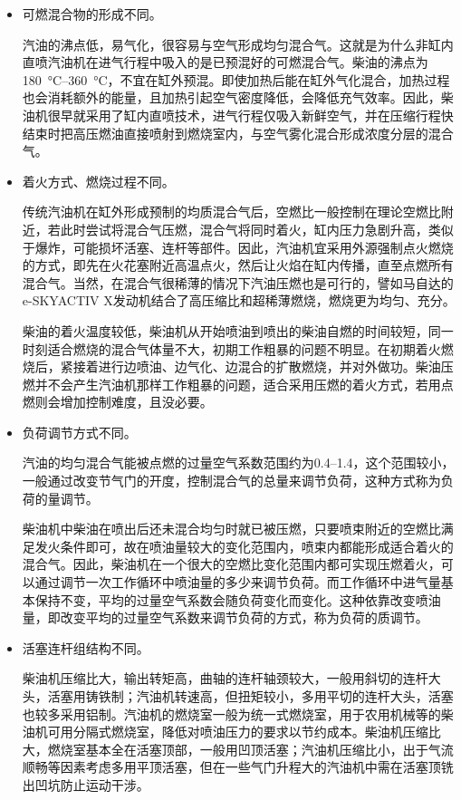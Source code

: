 \documentclass[UTF8]{ctexart}
\numberwithin{figure}{section}
\numberwithin{table}{section}
\begin{document}
\begin{itemize}
	\item 可燃混合物的形成不同。

	      汽油的沸点低，易气化，很容易与空气形成均匀混合气。这就是为什么非缸内直喷汽油机在进气行程中吸入的是已预混好的可燃混合气。柴油的沸点为\qtyrange[range-phrase = $\,\sim\,$, range-units = single]{180}{360}{\celsius}，不宜在缸外预混。即使加热后能在缸外气化混合，加热过程也会消耗额外的能量，且加热引起空气密度降低，会降低充气效率。因此，柴油机很早就采用了缸内直喷技术，进气行程仅吸入新鲜空气，并在压缩行程快结束时把高压燃油直接喷射到燃烧室内，与空气雾化混合形成浓度分层的混合气。

	\item 着火方式、燃烧过程不同。

	      传统汽油机在缸外形成预制的均质混合气后，空燃比一般控制在理论空燃比附近，若此时尝试将混合气压燃，混合气将同时着火，缸内压力急剧升高，类似于爆炸，可能损坏活塞、连杆等部件。因此，汽油机宜采用外源强制点火燃烧的方式，即先在火花塞附近高温点火，然后让火焰在缸内传播，直至点燃所有混合气。当然，在混合气很稀薄的情况下汽油压燃也是可行的，譬如马自达的e-SKYACTIV X发动机结合了高压缩比和超稀薄燃烧，燃烧更为均匀、充分。

	      柴油的着火温度较低，柴油机从开始喷油到喷出的柴油自燃的时间较短，同一时刻适合燃烧的混合气体量不大，初期工作粗暴的问题不明显。在初期着火燃烧后，紧接着进行边喷油、边气化、边混合的扩散燃烧，并对外做功。柴油压燃并不会产生汽油机那样工作粗暴的问题，适合采用压燃的着火方式，若用点燃则会增加控制难度，且没必要。

	\item 负荷调节方式不同。

	      汽油的均匀混合气能被点燃的过量空气系数范围约为\numrange[range-phrase = $\,\sim\,$]{0.4}{1.4}，这个范围较小，一般通过改变节气门的开度，控制混合气的总量来调节负荷，这种方式称为负荷的量调节。

	      柴油机中柴油在喷出后还未混合均匀时就已被压燃，只要喷束附近的空燃比满足发火条件即可，故在喷油量较大的变化范围内，喷束内都能形成适合着火的混合气。因此，柴油机在一个很大的空燃比变化范围内都可实现压燃着火，可以通过调节一次工作循环中喷油量的多少来调节负荷。而工作循环中进气量基本保持不变，平均的过量空气系数会随负荷变化而变化。这种依靠改变喷油量，即改变平均的过量空气系数来调节负荷的方式，称为负荷的质调节。

	\item 活塞连杆组结构不同。

	      柴油机压缩比大，输出转矩高，曲轴的连杆轴颈较大，一般用斜切的连杆大头，活塞用铸铁制；汽油机转速高，但扭矩较小，多用平切的连杆大头，活塞也较多采用铝制。汽油机的燃烧室一般为统一式燃烧室，用于农用机械等的柴油机可用分隔式燃烧室，降低对喷油压力的要求以节约成本。柴油机压缩比大，燃烧室基本全在活塞顶部，一般用凹顶活塞；汽油机压缩比小，出于气流顺畅等因素考虑多用平顶活塞，但在一些气门升程大的汽油机中需在活塞顶铣出凹坑防止运动干涉。


\end{itemize}
\end{document}
